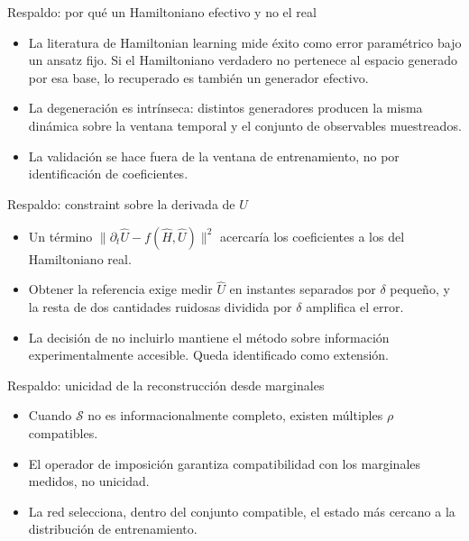 \documentclass[10pt,aspectratio=169]{beamer}
\newcommand{\Uop}{\hat{U}}
\newcommand{\Hop}{\hat{H}}
\newcommand{\dens}{\rho}
\begin{document}
\appendix

\begin{frame}{Respaldo: por qué un Hamiltoniano efectivo y no el real}
  \begin{itemize}
    \item La literatura de Hamiltonian learning mide éxito como error paramétrico bajo un ansatz fijo. Si el Hamiltoniano verdadero no pertenece al espacio generado por esa base, lo recuperado es también un generador efectivo.
    \item La degeneración es intrínseca: distintos generadores producen la misma dinámica sobre la ventana temporal y el conjunto de observables muestreados.
    \item La validación se hace fuera de la ventana de entrenamiento, no por identificación de coeficientes.
  \end{itemize}
\end{frame}

\begin{frame}{Respaldo: constraint sobre la derivada de $\Uop$}
  \begin{itemize}
    \item Un término $\|\partial_t \Uop - f(\Hop,\Uop)\|^2$ acercaría los coeficientes a los del Hamiltoniano real.
    \item Obtener la referencia exige medir $\Uop$ en instantes separados por $\delta$ pequeño, y la resta de dos cantidades ruidosas dividida por $\delta$ amplifica el error.
    \item La decisión de no incluirlo mantiene el método sobre información experimentalmente accesible. Queda identificado como extensión.
  \end{itemize}
\end{frame}

\begin{frame}{Respaldo: unicidad de la reconstrucción desde marginales}
  \begin{itemize}
    \item Cuando $\mathcal{S}$ no es informacionalmente completo, existen múltiples $\dens$ compatibles.
    \item El operador de imposición garantiza compatibilidad con los marginales medidos, no unicidad.
    \item La red selecciona, dentro del conjunto compatible, el estado más cercano a la distribución de entrenamiento.
  \end{itemize}
\end{frame}
\end{document}
